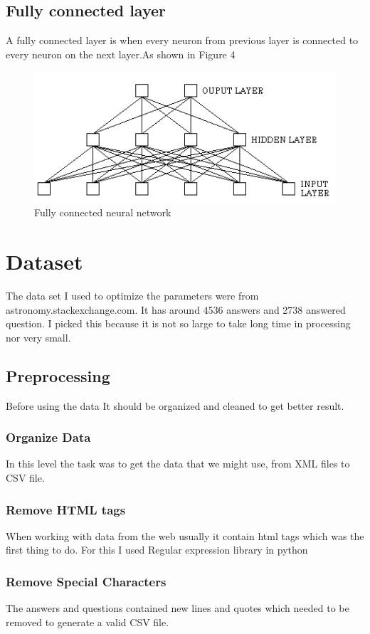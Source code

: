 \documentclass{article}
\begin{document}
\begin{multicols*}{2}
\begin{flushleft}
\subsection{Fully connected layer}
A fully connected layer is when every neuron from previous layer is connected to every neuron on the next layer.As shown in Figure 4
\begin{figure}[H]
\includegraphics[scale=0.54]{FCN.png}
\caption{Fully connected neural network \cite{10}}
\end{figure}
\section{Dataset}
The data set I used to optimize the parameters were from astronomy.stackexchange.com. It has around 4536 answers and 2738 answered question. I picked this because it is not so large to take long time in processing nor very small.
\subsection{Preprocessing}
Before using the data It should be organized and cleaned to get better result.
\subsubsection{Organize Data}
In this level the task was to get the data that we might use, from XML files to CSV file.
\subsubsection{Remove HTML tags}
When working with data from the web usually it contain html  tags which was the first thing to do. For this I used Regular expression library in python
\subsubsection{Remove Special Characters}
The answers and questions contained new lines and quotes which needed to be removed to generate a valid CSV file.

\end{flushleft}
\end{multicols*}
\end{document}
